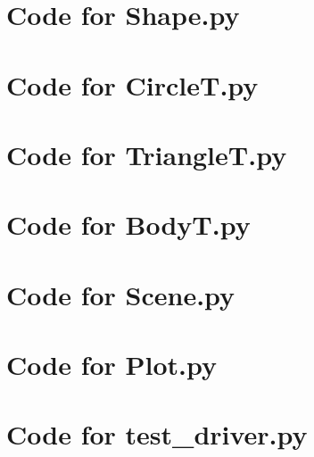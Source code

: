 \documentclass[12pt]{article}
\begin{document}
\def\thesection{\Alph{section}}

\section{Code for Shape.py}

\noindent 

\newpage

\section{Code for CircleT.py}

\noindent 

\newpage

\section{Code for TriangleT.py}

\noindent 

\newpage

\section{Code for BodyT.py}

\noindent 

\newpage

\section{Code for Scene.py}

\noindent 

\newpage

\section{Code for Plot.py}

\noindent 

\newpage

\section{Code for test\_driver.py}

\noindent 

\newpage
\end{document}
